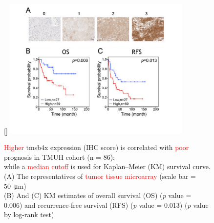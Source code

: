 \documentclass[
paper=landscape,
paper=160mm:90mm, %
fontsize=11pt, %
pagesize, %
parskip=half-, %
]{scrartcl} %
\theoremstyle{mythmstyle} %
\begin{document}
{\clearpage


\thispagestyle{headings}

\begin{figure}[ht]
[\FBwidth]
{    \includegraphics[height=7.0cm]{Figure-4_IHC_Hsiao.pdf}}
{\captionsetup{labelformat=empty}    
\caption{\textcolor{red}{Higher} \acrshort{tmsb4x} expression (IHC score) is correlated with \textcolor{red}{poor} prognosis in TMUH cohort (n = 86);\\[0.2cm]
while a \textcolor{red}{median cutoff} is used for Kaplan--Meier (KM) survival curve.\\[0.2cm]
\tiny
(A) The representatives of \textcolor{red}{tumor tissue microarray} (scale bar = 50~\si{\um}) \\
(B) And (C) KM estimates of overall survival (OS) (\textit{p} value = 0.006) and recurrence-free survival (RFS) (\textit{p} value = 0.013) (\textit{p} value by log-rank test)}}

\end{figure}

\clearpage



\thispagestyle{headings}

}
\end{document}
